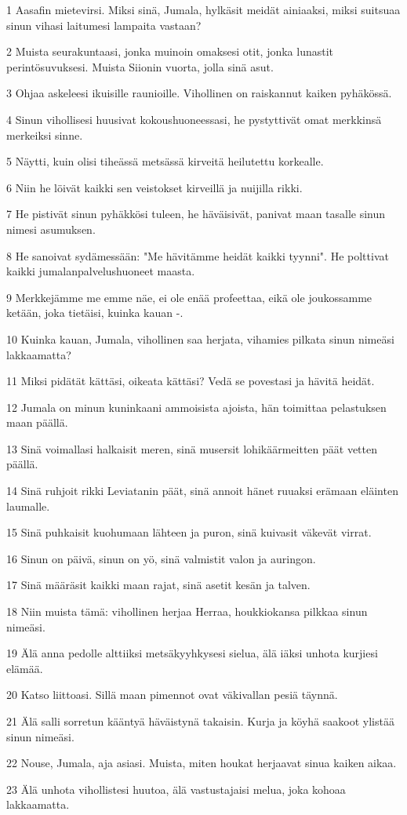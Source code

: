 \par 1 Aasafin mietevirsi. Miksi sinä, Jumala, hylkäsit meidät ainiaaksi, miksi suitsuaa sinun vihasi laitumesi lampaita vastaan?
\par 2 Muista seurakuntaasi, jonka muinoin omaksesi otit, jonka lunastit perintösuvuksesi. Muista Siionin vuorta, jolla sinä asut.
\par 3 Ohjaa askeleesi ikuisille raunioille. Vihollinen on raiskannut kaiken pyhäkössä.
\par 4 Sinun vihollisesi huusivat kokoushuoneessasi, he pystyttivät omat merkkinsä merkeiksi sinne.
\par 5 Näytti, kuin olisi tiheässä metsässä kirveitä heilutettu korkealle.
\par 6 Niin he löivät kaikki sen veistokset kirveillä ja nuijilla rikki.
\par 7 He pistivät sinun pyhäkkösi tuleen, he häväisivät, panivat maan tasalle sinun nimesi asumuksen.
\par 8 He sanoivat sydämessään: "Me hävitämme heidät kaikki tyynni". He polttivat kaikki jumalanpalvelushuoneet maasta.
\par 9 Merkkejämme me emme näe, ei ole enää profeettaa, eikä ole joukossamme ketään, joka tietäisi, kuinka kauan -.
\par 10 Kuinka kauan, Jumala, vihollinen saa herjata, vihamies pilkata sinun nimeäsi lakkaamatta?
\par 11 Miksi pidätät kättäsi, oikeata kättäsi? Vedä se povestasi ja hävitä heidät.
\par 12 Jumala on minun kuninkaani ammoisista ajoista, hän toimittaa pelastuksen maan päällä.
\par 13 Sinä voimallasi halkaisit meren, sinä musersit lohikäärmeitten päät vetten päällä.
\par 14 Sinä ruhjoit rikki Leviatanin päät, sinä annoit hänet ruuaksi erämaan eläinten laumalle.
\par 15 Sinä puhkaisit kuohumaan lähteen ja puron, sinä kuivasit väkevät virrat.
\par 16 Sinun on päivä, sinun on yö, sinä valmistit valon ja auringon.
\par 17 Sinä määräsit kaikki maan rajat, sinä asetit kesän ja talven.
\par 18 Niin muista tämä: vihollinen herjaa Herraa, houkkiokansa pilkkaa sinun nimeäsi.
\par 19 Älä anna pedolle alttiiksi metsäkyyhkysesi sielua, älä iäksi unhota kurjiesi elämää.
\par 20 Katso liittoasi. Sillä maan pimennot ovat väkivallan pesiä täynnä.
\par 21 Älä salli sorretun kääntyä häväistynä takaisin. Kurja ja köyhä saakoot ylistää sinun nimeäsi.
\par 22 Nouse, Jumala, aja asiasi. Muista, miten houkat herjaavat sinua kaiken aikaa.
\par 23 Älä unhota vihollistesi huutoa, älä vastustajaisi melua, joka kohoaa lakkaamatta.

